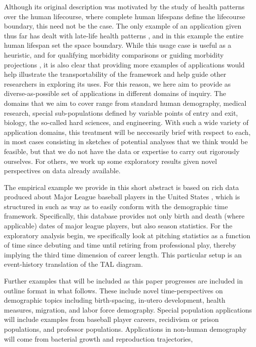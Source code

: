 \documentclass[11pt,oneside]{article} %
\begin{document}
Although its original description was
motivated by the study of health patterns over the human lifecourse, where
complete human lifespans define the lifecourse boundary, this need not be the
case.
The only example of an application given thus far has dealt with late-life
health patterns \citep{riffe2015ttd}, and in this example the entire human
lifespan set the space boundary. While this usage case is useful as a heuristic,
and for qualifying morbidity comparisons or guiding morbidity projections
\citep{vanRaalte2015HLE}, it is also clear that providing more
examples of applications would help illustrate the transportability of the
framework and help guide other researchers in exploring its uses. For this
reason, we here aim to provide as diverse-as-possible set of applications in
different domains of inquiry. The domains that we aim to cover range from
standard human demography, medical research, special sub-populations defined by
variable points of entry and exit, biology, the so-called hard sciences, and
engineering. With such a wide variety of application domains, this treatment
will be neccesarily brief with respect to each, in most cases consisting in
sketches of potential analyses that we think would be feasible, but that we do
not have the data or expertise to carry out rigorously ourselves. For others, we
work up some exploratory results given novel perspectives on data already
available. 

The empirical example we provide in this short abstract is based on rich
data produced about Major League baseball players in the United States
\citep{Lahman}, which is structured in such as way as to easily conform with the
demographic time framework. Specifically, this database provides not only birth
and death (where applicable) dates of major league players, but also season
statistics. For the exploratory analysis begin, we specifically look at
pitching statistics as a function of time since debuting and time until retiring
from professional play, thereby implying the third time dimension of career
length. This particular setup is an event-history translation of the TAL
diagram.

Further examples that will be included as this paper progresses are included in
outline format in what follows. These include novel time-perspectives on
demographic topics including birth-spacing, in-utero development, health
measures, migration, and labor force demography. Special population applications
will include examples from baseball player careers, recidivism or prison
populations, and professor populations. Applications in non-human demography
will come from bacterial growth and reproduction trajectories, 
\end{document}
